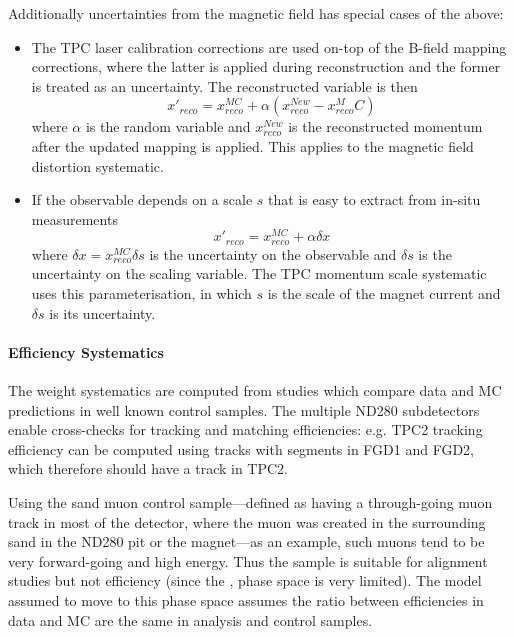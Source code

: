 Additionally uncertainties from the magnetic field has special cases of the above:
\begin{itemize}
	\item The TPC laser calibration corrections are used on-top of the B-field mapping corrections, where the latter is applied during reconstruction and the former is treated as an uncertainty. The reconstructed variable is then
	\begin{equation}
		x'_{reco} = x^{MC}_{reco} + \alpha \left(x_{reco}^{New}-x_{reco}^MC\right)
	\end{equation}
	where $\alpha$ is the random variable and $x_{reco}^{New}$ is the reconstructed momentum after the updated mapping is applied. This applies to the magnetic field distortion systematic.
	\item If the observable depends on a scale $s$ that is easy to extract from in-situ measurements
	\begin{equation}
		x'_{reco} = x_{reco}^{MC}+\alpha \delta x
	\end{equation}
	where $\delta x = x_{reco}^{MC} \delta s$ is the uncertainty on the observable and $\delta s$ is the uncertainty on the scaling variable. The TPC momentum scale systematic uses this parameterisation, in which $s$ is the scale of the magnet current and $\delta s$ is its uncertainty.
\end{itemize}

\paragraph{Efficiency Systematics}
The weight systematics are computed from studies which compare data and MC predictions in well known control samples. The multiple ND280 subdetectors enable cross-checks for tracking and matching efficiencies: e.g. TPC2 tracking efficiency can be computed using tracks with segments in FGD1 and FGD2, which therefore should have a track in TPC2.

Using the sand muon control sample---defined as having a through-going muon track in most of the detector, where the muon was created in the surrounding sand in the ND280 pit or the magnet---as an example, such muons tend to be very forward-going and high energy. Thus the sample is suitable for alignment studies but not efficiency (since the \pmu, \cosmu phase space is very limited). The model assumed to move to this phase space assumes the ratio between efficiencies in data and MC are the same in analysis and control samples.

